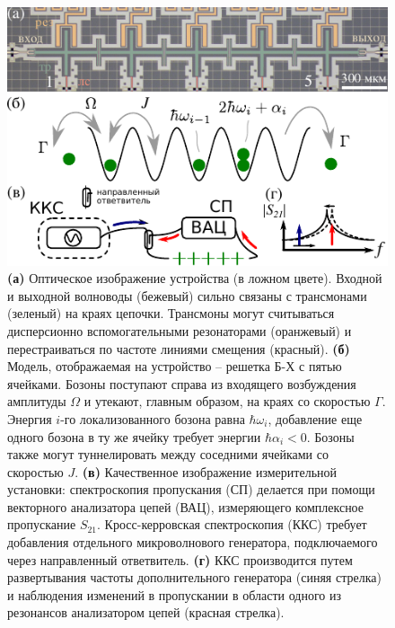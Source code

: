 \documentclass[14pt, a4paper]{extarticle}
\begin{document}
\begin{figure}[t]
	\centering
	\includegraphics[width=0.8\linewidth]{Pictures/scheme_bh}
	\caption{\textbf{(а)} Оптическое изображение устройства (в ложном цвете). Входной и выходной волноводы (бежевый) сильно связаны с трансмонами (зеленый) на краях цепочки. Трансмоны могут считываться дисперсионно вспомогательными резонаторами (оранжевый) и перестраиваться по частоте линиями смещения (красный). \textbf{(б)} Модель, отображаемая на устройство -- решетка Б-Х с пятью ячейками. Бозоны поступают справа из входящего возбуждения амплитуды $\Omega$ и утекают, главным образом, на краях со скоростью $\Gamma$. Энергия $i$-го локализованного бозона равна $\hbar\omega_i$, добавление еще одного бозона в ту же ячейку требует энергии $\hbar \alpha_i<0$. Бозоны также могут туннелировать между соседними ячейками со скоростью $J$. \textbf{(в)} Качественное изображение измерительной установки: спектроскопия пропускания (СП) делается при помощи векторного анализатора цепей (ВАЦ), измеряющего комплексное пропускание $S_{21}$. Кросс-керровская спектроскопия (ККС) требует добавления отдельного микроволнового генератора, подключаемого через направленный ответвитель. \textbf{(г)} ККС производится путем развертывания частоты дополнительного генератора (синяя стрелка) и наблюдения изменений в пропускании в области одного из резонансов анализатором цепей (красная стрелка).}
	\label{fig:schemebh}
\end{figure}
\end{document}
